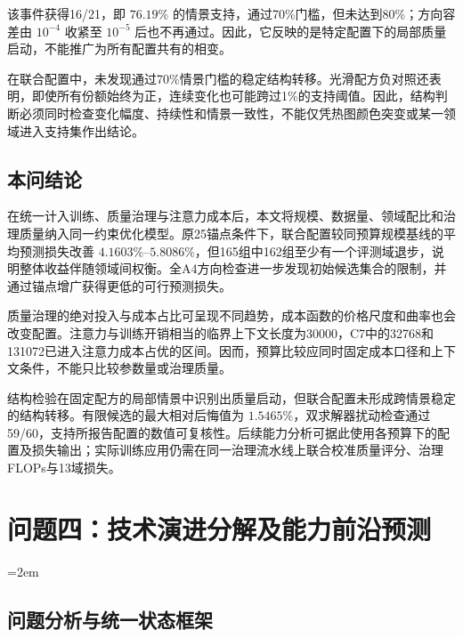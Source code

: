 \documentclass[bwprint]{gmcmthesis}
\begin{document}
该事件获得16/21，即 $76.19\%$ 的情景支持，通过70\%门槛，但未达到80\%；方向容差由 $10^{-4}$ 收紧至 $10^{-5}$ 后也不再通过。因此，它反映的是特定配置下的局部质量启动，不能推广为所有配置共有的相变。

在联合配置中，未发现通过70\%情景门槛的稳定结构转移。光滑配方负对照还表明，即使所有份额始终为正，连续变化也可能跨过1\%的支持阈值。因此，结构判断必须同时检查变化幅度、持续性和情景一致性，不能仅凭热图颜色突变或某一领域进入支持集作出结论。

\subsection{本问结论}

在统一计入训练、质量治理与注意力成本后，本文将规模、数据量、领域配比和治理质量纳入同一约束优化模型。原25锚点条件下，联合配置较同预算规模基线的平均预测损失改善 $4.1603\%$--$5.8086\%$，但165组中162组至少有一个评测域退步，说明整体收益伴随领域间权衡。全A4方向检查进一步发现初始候选集合的限制，并通过锚点增广获得更低的可行预测损失。

质量治理的绝对投入与成本占比可呈现不同趋势，成本函数的价格尺度和曲率也会改变配置。注意力与训练开销相当的临界上下文长度为30000，C7中的32768和131072已进入注意力成本占优的区间。因而，预算比较应同时固定成本口径和上下文条件，不能只比较参数量或治理质量。

结构检验在固定配方的局部情景中识别出质量启动，但联合配置未形成跨情景稳定的结构转移。有限候选的最大相对后悔值为 $1.5465\%$，双求解器扰动检查通过59/60，支持所报告配置的数值可复核性。后续能力分析可据此使用各预算下的配置及损失输出；实际训练应用仍需在同一治理流水线上联合校准质量评分、治理FLOPs与13域损失。

\endgroup

\section{问题四：技术演进分解及能力前沿预测}
\begingroup
\normalsize
\emergencystretch=2em
\setlength{\parskip}{0pt}
\setlength{\textfloatsep}{5pt plus 1pt minus 1pt}
\setlength{\floatsep}{4pt plus 1pt minus 1pt}
\setlength{\intextsep}{5pt plus 1pt minus 1pt}
\setlength{\abovedisplayskip}{6pt}
\setlength{\belowdisplayskip}{6pt}
\setlength{\belowcaptionskip}{2pt}
\subsection{问题分析与统一状态框架}
\end{document}
